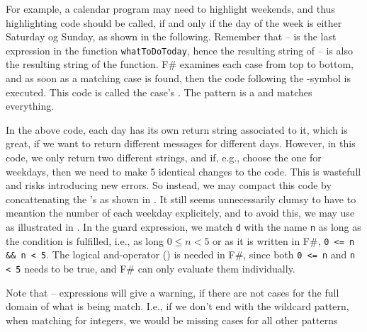 \documentclass[fsharpNotes.tex]{subfiles}
\begin{document}
For example, a calendar program may need to highlight weekends, and thus highlighting code should be called, if and only if the day of the week is either Saturday og Sunday, as shown in the following. 
%
%
Remember that  --  is the last expression in the function \lstinline{whatToDoToday}, hence the resulting string of  --  is also the resulting string of the function. F\# examines each case from top to bottom, and as soon as a matching case is found, then the code following the \lexeme{->}-symbol is executed. This code is called the case's . The \lexeme{_} pattern is a  and matches everything.

In the above code, each day has its own return string associated to it, which is great, if we want to return different messages for different days. However, in this code, we only return two different strings, and if, e.g., choose the one for weekdays, then we need to make 5 identical changes to the code. This is wastefull and risks introducing new errors. So instead, we may compact this code by concattenating the \lexeme{|}'s as shown in .
% 
%
It still seems unnecessarily clumsy to have to meantion the number of each weekday explicitely, and to avoid this, we may use  as illustrated in .
% 
%
In the guard expression, we match \lstinline{d} with the name \lstinline{n} as long as the condition is fulfilled, i.e., as long $0\leq n <5$ or as it is written in F\#, \lstinline{0 <= n && n < 5}. The logical and-operator (\lexeme{&&}) is needed in F\#, since both \lstinline{0 <= n} and \lstinline{n < 5} needs to be true, and F\# can only evaluate them individually.

Note that  --  expressions will give a warning, if there are not cases for the full domain of what is being match. I.e., if we don't end with the wildcard pattern, when matching for integers, we would be missing cases for all other patterns
%
%
\end{document}
